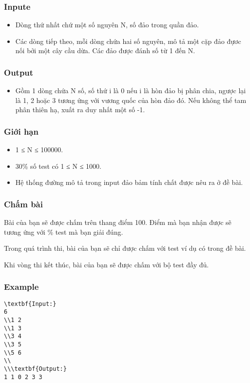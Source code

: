 \subsubsection{   Inpute  }
\begin{itemize}
	\item     Dòng thứ nhất chứ một số nguyên N, số đảo trong quần đảo.   
	\item     Các dòng tiếp theo, mỗi dòng chứa hai số nguyên, mô tả một cặp đảo đựơc nối bởi một cây cầu dừa. Các đảo được đánh số từ 1 đến N.   
\end{itemize}

\subsubsection{   Output  }
\begin{itemize}
	\item     Gồm 1 dòng chứa N số, số thứ i là 0 nếu i là hòn đảo bị phân chia, ngược lại là 1, 2 hoặc 3 tương ứng với vương quốc của hòn đảo đó. Nếu không thể tam phân thiên hạ, xuất ra duy nhất một số -1.   
\end{itemize}

\subsubsection{   Giới hạn  }
\begin{itemize}
	\item     1 ≤ N ≤ 100000.   
	\item     30\% số test có 1 ≤ N ≤ 1000.   
	\item     Hệ thống đường mô tả trong input đảo bảm tính chất được nêu ra ở đề bài.   
\end{itemize}

\subsubsection{   Chấm bài  }

   Bài của bạn sẽ được chấm trên thang điểm 100. Điểm mà bạn nhận được sẽ tương ứng với \% test mà bạn giải đúng.  

   Trong quá trình thi, bài của bạn sẽ chỉ được chấm với test ví dụ có trong đề bài.  

   Khi vòng thi kết thúc, bài của bạn sẽ được chấm với bộ test đầy đủ.  

\subsubsection{   Example  }
\begin{verbatim}
\textbf{Input:}
6
\\1 2
\\1 3
\\3 4
\\3 5
\\5 6
\\
\\\textbf{Output:}
1 1 0 2 3 3
\end{verbatim}